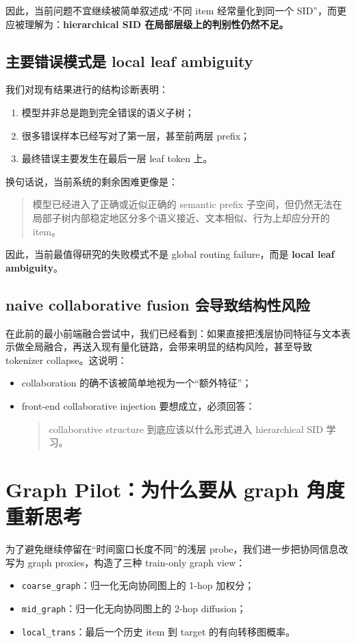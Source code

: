 \documentclass[11pt]{article}
\begin{document}
因此，当前问题不宜继续被简单叙述成“不同 item 经常量化到同一个 SID”，而更应被理解为：\textbf{hierarchical SID 在局部层级上的判别性仍然不足。}

\subsection{主要错误模式是 local leaf ambiguity}

我们对现有结果进行的结构诊断表明：
\begin{enumerate}
  \item 模型并非总是跑到完全错误的语义子树；
  \item 很多错误样本已经写对了第一层，甚至前两层 prefix；
  \item 最终错误主要发生在最后一层 leaf token 上。
\end{enumerate}

换句话说，当前系统的剩余困难更像是：
\begin{quote}
模型已经进入了正确或近似正确的 semantic prefix 子空间，但仍然无法在局部子树内部稳定地区分多个语义接近、文本相似、行为上却应分开的 item。
\end{quote}

因此，当前最值得研究的失败模式不是 global routing failure，而是 \textbf{local leaf ambiguity}。

\subsection{naive collaborative fusion 会导致结构性风险}

在此前的最小前端融合尝试中，我们已经看到：如果直接把浅层协同特征与文本表示做全局融合，再送入现有量化链路，会带来明显的结构风险，甚至导致 tokenizer collapse。这说明：
\begin{itemize}
  \item collaboration 的确不该被简单地视为一个“额外特征”；
  \item front-end collaborative injection 要想成立，必须回答：
  \begin{quote}
  collaborative structure 到底应该以什么形式进入 hierarchical SID 学习。
  \end{quote}
\end{itemize}

\section{Graph Pilot：为什么要从 graph 角度重新思考}

为了避免继续停留在“时间窗口长度不同”的浅层 probe，我们进一步把协同信息改写为 graph proxies，构造了三种 train-only graph view：
\begin{itemize}
  \item \texttt{coarse\_graph}：归一化无向协同图上的 1-hop 加权分；
  \item \texttt{mid\_graph}：归一化无向协同图上的 2-hop diffusion；
  \item \texttt{local\_trans}：最后一个历史 item 到 target 的有向转移图概率。
\end{itemize}
\end{document}
